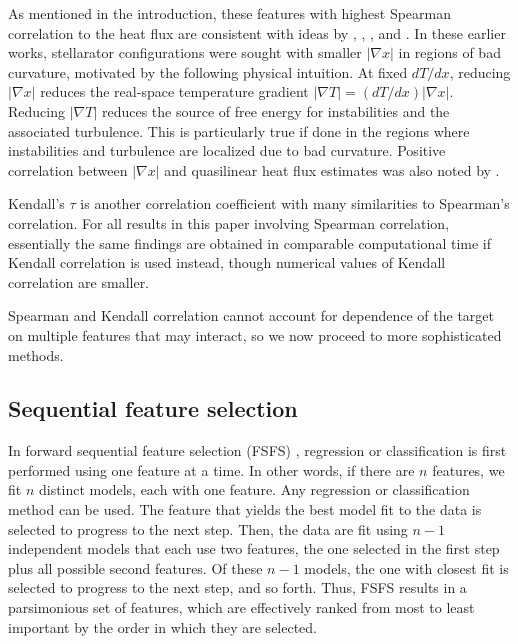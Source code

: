 \documentclass{jpp}
\newcommand{\changed}[1]{{#1}}
\begin{document}
As mentioned in the introduction, these features with highest Spearman correlation to the heat flux are consistent with ideas by \cite{mynick2010optimizing}, \cite{xanthopoulos2014controlling}, \cite{stroteich2022seeking}, and \cite{goodman2024quasi}.
In these earlier works, stellarator configurations were sought with smaller $|\nabla x|$ in regions of bad curvature, motivated by the following physical intuition.
At fixed $dT/dx$, reducing $|\nabla x|$ reduces the real-space temperature gradient $|\nabla T| = (dT/dx)|\nabla x|$.
Reducing $|\nabla T|$ reduces the source of free energy for instabilities and the associated turbulence.
This is particularly true if done in the regions where instabilities and turbulence are localized due to bad curvature.
Positive correlation between $|\nabla x|$ and quasilinear heat flux estimates was also noted by \cite{Jorge2023}.

\changed{
Kendall's $\tau$ is another correlation coefficient with many similarities to Spearman's correlation.
For all results in this paper involving Spearman correlation, essentially the same findings are obtained in comparable computational time if Kendall correlation is used instead, though numerical values of Kendall correlation are smaller.
}

Spearman \changed{and Kendall} correlation cannot account for dependence of the target on multiple features that may interact, so we now proceed to more sophisticated methods.


\subsection{Sequential feature selection}
\label{sec:sfs}

In forward sequential feature selection (FSFS) \citep{efroymson1960, whitney1971direct}, regression or classification is first performed using one feature at a time.
In other words, if there are $n$ features, we fit $n$ distinct models, each with one feature.
Any regression or classification method can be used.
The feature that yields the best model fit to the data is selected to progress to the next step.
Then, the data are fit using $n-1$ independent models that each use two features, the one selected in the first step plus all possible second features.
Of these $n-1$ models, the one with closest fit is selected to progress to the next step, and so forth.
Thus, FSFS results in a parsimonious set of features, which are effectively ranked from most to least important by the order in which they are selected.
\end{document}
